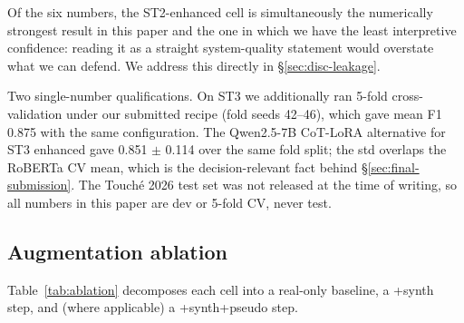 Of the six numbers, the ST2-enhanced cell is simultaneously the numerically strongest result in this paper and the one in which we have the least interpretive confidence: reading it as a straight system-quality statement would overstate what we can defend. We address this directly in \S\ref{sec:disc-leakage}.

Two single-number qualifications. On ST3 we additionally ran 5-fold cross-validation under our submitted recipe (fold seeds 42--46), which gave mean F1 0.875 with the same configuration. %
The Qwen2.5-7B CoT-LoRA alternative for ST3 enhanced gave 0.851 $\pm$ 0.114 over the same fold split; the std overlaps the RoBERTa CV mean, which is the decision-relevant fact behind \S\ref{sec:final-submission}. %
The Touch\'{e} 2026 test set was not released at the time of writing, so all numbers in this paper are dev or 5-fold CV, never test.

\subsection{Augmentation ablation}
\label{sec:ablation}

Table~\ref{tab:ablation} decomposes each cell into a real-only baseline, a +synth step, and (where applicable) a +synth+pseudo step.


